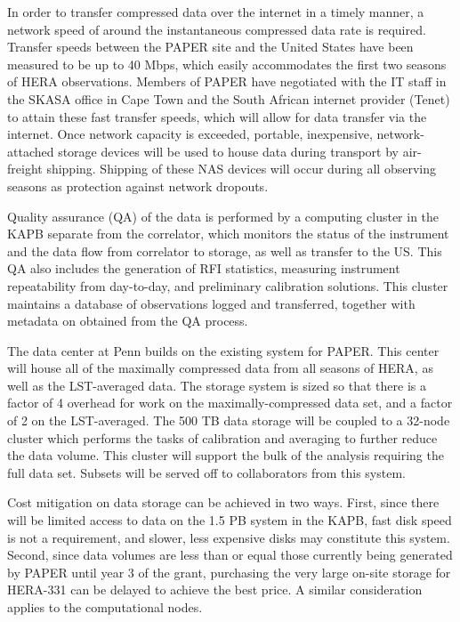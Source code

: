 \documentclass[preprint]{aastex}
\begin{document}
In order to transfer compressed data over the internet in a timely
manner, a network speed of around the instantaneous compressed data
rate is required. Transfer speeds between the PAPER site and the
United States have been measured to be up to 40 Mbps, which easily
accommodates the first two seasons of HERA observations. Members of
PAPER have negotiated with the IT staff in the SKASA office in Cape
Town and the South African internet provider (Tenet) to attain
these fast transfer speeds, which will allow for data transfer via the
internet. Once network capacity is exceeded, portable, inexpensive,
network-attached storage devices will be used to house data during
transport by air-freight shipping. Shipping of these NAS devices will
occur during all observing seasons as protection against network
dropouts.

Quality assurance (QA) of the data is performed by a computing cluster
in the KAPB separate from the correlator, which monitors the status of
the instrument and the data flow from correlator to storage, as well
as transfer to the US.  This QA also includes the generation of RFI
statistics, measuring instrument repeatability from day-to-day, 
and preliminary calibration solutions.  This cluster maintains a
database of observations logged and transferred, together with
metadata on obtained from the QA process.


The data center at Penn builds on the existing system for PAPER.  This
center will house all of the maximally compressed data from all
seasons of HERA, as well as the LST-averaged data.  The storage system
is sized so that there is a factor of 4 overhead for work on the
maximally-compressed data set, and a factor of 2 on the LST-averaged.
The 500 TB data storage will be coupled to a 32-node cluster which
performs the tasks of calibration and averaging to further reduce the
data volume.  This cluster will support the bulk of the analysis
requiring the full data set.  Subsets will be served off to
collaborators from this system.

Cost mitigation on data storage can be achieved in two ways. First,
since there will be limited access to data on the 1.5 PB system in the
KAPB, fast disk speed is not a requirement, and slower, less expensive
disks may constitute this system.  Second, since data volumes are less
than or equal those currently being generated by PAPER until year 3 of
the grant, purchasing the very large on-site storage for HERA-331 can
be delayed to achieve the best price.  A similar consideration applies
to the computational nodes.
\end{document}
